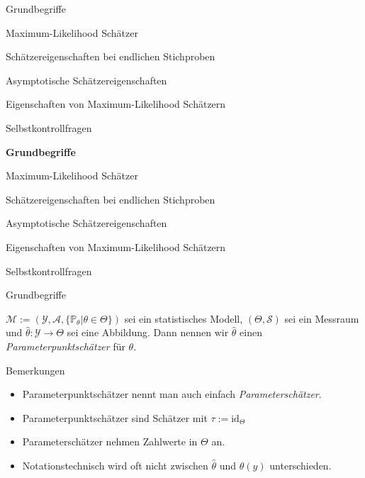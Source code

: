 \documentclass[
  8pt,
  ignorenonframetext,
]{beamer}
\providecommand{\tightlist}{%
  \setlength{\itemsep}{0pt}\setlength{\parskip}{0pt}}
\begin{document}
\begin{frame}{}
\protect\hypertarget{section-5}{}
\large
\vfill
{}

Grundbegriffe

Maximum-Likelihood Schätzer

Schätzereigenschaften bei endlichen Stichproben

Asymptotische Schätzereigenschaften

Eigenschaften von Maximum-Likelihood Schätzern

Selbstkontrollfragen \vfill
\end{frame}

\begin{frame}{}
\protect\hypertarget{section-6}{}
\large
\vfill
{}

\textbf{Grundbegriffe}

Maximum-Likelihood Schätzer

Schätzereigenschaften bei endlichen Stichproben

Asymptotische Schätzereigenschaften

Eigenschaften von Maximum-Likelihood Schätzern

Selbstkontrollfragen \vfill
\end{frame}

\begin{frame}{Grundbegriffe}
\protect\hypertarget{grundbegriffe}{}
\small
\begin{definition}[Parameterpunktschätzer]
\justifying
$\mathcal{M} := (\mathcal{Y}, \mathcal{A}, \{\mathbb{P}_\theta|\theta \in \Theta\})$
sei ein statistisches Modell, $(\Theta,\mathcal{S})$ sei ein Messraum und
$\hat{\theta} : \mathcal{Y} \to \Theta$ sei eine Abbildung. Dann nennen wir
$\hat{\theta}$ einen \textit{Parameterpunktschätzer} für $\theta$.
\end{definition}

Bemerkungen

\begin{itemize}
\tightlist
\item
  Parameterpunktschätzer nennt man auch einfach
  \emph{Parameterschätzer}.
\item
  Parameterpunktschätzer sind Schätzer mit \(\tau := \mbox{id}_\Theta\)
\item
  Parameterschätzer nehmen Zahlwerte in \(\Theta\) an.
\item
  Notationstechnisch wird oft nicht zwischen \(\hat{\theta}\) und
  \(\hat{\theta}(y)\) unterschieden.
\end{itemize}
\end{frame}
\end{document}
